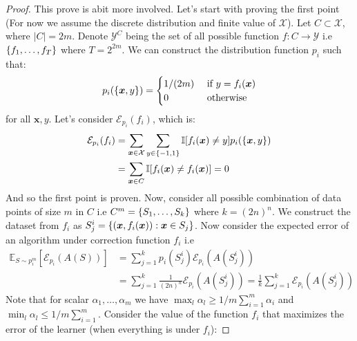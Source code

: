 \begin{proof}
    This prove is abit more involved. Let's start with proving the first point (For now we assume the discrete distribution and finite value of $\mathcal{X}$). Let $C\subset \mathcal{X}$, where $|C| = 2m$. Denote $\mathcal{Y}^C$ being the set of all possible function $f : C \rightarrow \mathcal{Y}$ i.e $\left\{ f_1,\dots, f_T \right\}$ where $T = 2^{2m}$. We can construct the distribution function $p_i$ such that:
    \begin{equation*}
        p_i(\left\{ \boldsymbol x, y \right\}) = \begin{cases}
            1/(2m) & \text{ if } y = f_i(\boldsymbol x) \\
            0 & \text{ otherwise }
        \end{cases}
    \end{equation*}
    for all $\boldsymbol x, y$. Let's consider $\mathcal{E}_{p_i}(f_i)$, which is:
    \begin{equation*}
    \begin{aligned}
        \mathcal{E}_{p_i}(f_i) &= \sum_{\boldsymbol x \in \mathcal{X}}\sum_{y \in \left\{ -1, 1 \right\}} \mathbb{I}[f_i(\boldsymbol x) \ne y] p_i(\left\{ \boldsymbol x, y \right\}) \\
        &= \sum_{\boldsymbol x \in C}\mathbb{I}[f_i(\boldsymbol x) \ne f_i(\boldsymbol x)] = 0
    \end{aligned}
    \end{equation*}
    And so the first point is proven. Now, consider all possible combination of data points of size $m$ in $C$ i.e $C^m = \left\{ S_1,\dots,S_k \right\}$ where $k = (2n)^n$. We construct the dataset from $f_i$ as $S_j^i = \left\{ (\boldsymbol x, f_i(\boldsymbol x)) : \boldsymbol x \in S_j \right\}$. Now consider the expected error of an algorithm under correction function $f_i$ i.e 
    \begin{equation*}
    \begin{aligned}
        \mathbb{E}_{S \sim p_i^m}[\mathcal{E}_{p_i}(A(S))] &= \sum^k_{j=1} p_i(S^i_j)\mathcal{E}_{p_i}(A(S^i_j)) \\
        &= \sum^k_{j=1}\frac{1}{(2n)^n}\mathcal{E}_{p_i}(A(S^i_j)) = \frac{1}{k}\sum^k_{j=1}\mathcal{E}_{p_i}(A(S^i_j))
    \end{aligned}
    \end{equation*}
    Note that for scalar $\alpha_1,\dots,\alpha_m$ we have $\max_l \alpha_l \ge 1/m\sum^m_{i=1}\alpha_i$ and $\min_l \alpha_l \le 1/m\sum^m_{i=1}$. Consider the value of the function $f_i$ that maximizes the error of the learner (when everything is under $f_i$):

\end{proof}
